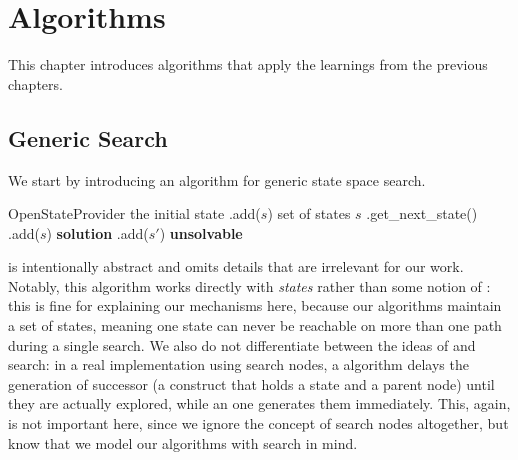 \chapter{Algorithms}


This chapter introduces algorithms that apply the learnings from the previous chapters.

\section{Generic Search}

We start by introducing an algorithm for generic state space search.

\begin{algorithm}
    \caption{Generic search}
    \label{alg:generic}
    \begin{algorithmic}[1]
        \State {} \ceq \New OpenStateProvider
        \State {} \ceq the initial state
        \State {}.add($s$)
        \EndIf
        \State {} \ceq \New set of states
        \State $s$ \ceq {}.get\_next\_state()
        \State {}.add($s$)
        \State \Return \textbf{solution}
        \EndIf
        \State {}.add($s'$)
        \EndIf
        \EndFor
        \EndIf
        \EndWhile
        \State \Return \textbf{unsolvable}
    \end{algorithmic}
\end{algorithm}

 is intentionally abstract and omits details that are irrelevant for our work. Notably, this algorithm works directly with \textit{states} rather than some notion of : this is fine for explaining our mechanisms here, because our algorithms maintain a set of  states, meaning one state can never be reachable on more than one path during a single search. We also do not differentiate between the ideas of  and  search: in a real implementation using search nodes, a  algorithm delays the generation of successor  (a construct that holds a state and a parent node) until they are actually explored, while an  one generates them immediately. This, again, is not important here, since we ignore the concept of search nodes altogether, but know that we model our algorithms with  search in mind.

